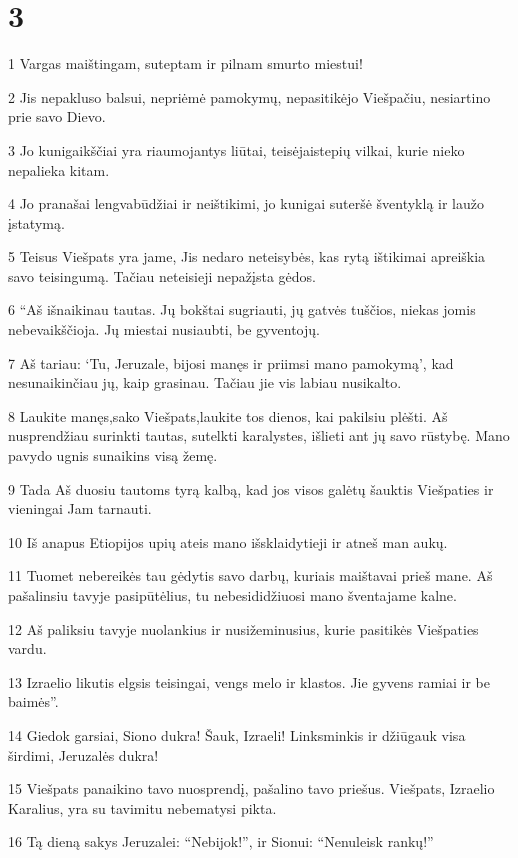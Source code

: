 \chapter{3}


\par 1 Vargas maištingam, suteptam ir pilnam smurto miestui! 
\par 2 Jis nepakluso balsui, nepriėmė pamokymų, nepasitikėjo Viešpačiu, nesiartino prie savo Dievo. 
\par 3 Jo kunigaikščiai yra riaumojantys liūtai, teisėjai­stepių vilkai, kurie nieko nepalieka kitam. 
\par 4 Jo pranašai lengvabūdžiai ir neištikimi, jo kunigai suteršė šventyklą ir laužo įstatymą. 
\par 5 Teisus Viešpats yra jame, Jis nedaro neteisybės, kas rytą ištikimai apreiškia savo teisingumą. Tačiau neteisieji nepažįsta gėdos. 
\par 6 “Aš išnaikinau tautas. Jų bokštai sugriauti, jų gatvės tuščios, niekas jomis nebevaikščioja. Jų miestai nusiaubti, be gyventojų. 
\par 7 Aš tariau: ‘Tu, Jeruzale, bijosi manęs ir priimsi mano pamokymą’, kad nesunaikinčiau jų, kaip grasinau. Tačiau jie vis labiau nusikalto. 
\par 8 Laukite manęs,­sako Viešpats,­laukite tos dienos, kai pakilsiu plėšti. Aš nusprendžiau surinkti tautas, sutelkti karalystes, išlieti ant jų savo rūstybę. Mano pavydo ugnis sunaikins visą žemę. 
\par 9 Tada Aš duosiu tautoms tyrą kalbą, kad jos visos galėtų šauktis Viešpaties ir vieningai Jam tarnauti. 
\par 10 Iš anapus Etiopijos upių ateis mano išsklaidytieji ir atneš man aukų. 
\par 11 Tuomet nebereikės tau gėdytis savo darbų, kuriais maištavai prieš mane. Aš pašalinsiu tavyje pasipūtėlius, tu nebesididžiuosi mano šventajame kalne. 
\par 12 Aš paliksiu tavyje nuolankius ir nusižeminusius, kurie pasitikės Viešpaties vardu. 
\par 13 Izraelio likutis elgsis teisingai, vengs melo ir klastos. Jie gyvens ramiai ir be baimės”. 
\par 14 Giedok garsiai, Siono dukra! Šauk, Izraeli! Linksminkis ir džiūgauk visa širdimi, Jeruzalės dukra! 
\par 15 Viešpats panaikino tavo nuosprendį, pašalino tavo priešus. Viešpats, Izraelio Karalius, yra su tavimi­tu nebematysi pikta. 
\par 16 Tą dieną sakys Jeruzalei: “Nebijok!”, ir Sionui: “Nenuleisk rankų!” 
